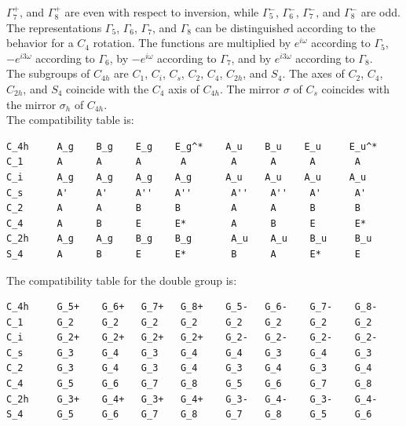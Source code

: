 \documentclass[12pt,a4paper]{article}
\begin{document}
$\Gamma_7^+$, and $\Gamma_8^+$ are even with respect to inversion, while
$\Gamma_5^-$, $\Gamma_6^-$, $\Gamma_7^-$, and $\Gamma_8^-$ are odd.
The representations $\Gamma_5$, $\Gamma_6$, $\Gamma_7$, and $\Gamma_8$ can
be distinguished according to the behavior for a $C_4$ rotation. The
functions are multiplied by $e^{i\omega}$ according to $\Gamma_5$,
$-e^{i3\omega}$ according to $\Gamma_6$, by $-e^{i\omega}$ according to
$\Gamma_7$, and by $e^{i3\omega}$ according to $\Gamma_8$.\\
The subgroups of $C_{4h}$ are $C_1$, $C_i$, $C_s$, $C_2$, $C_4$, $C_{2h}$,
and $S_4$.  The axes of $C_2$, $C_4$, $C_{2h}$, and $S_4$
coincide with the $C_4$ axis of $C_{4h}$.
The mirror $\sigma$ of $C_s$ coincides with the mirror $\sigma_h$ of $C_{4h}$. \\
The compatibility table is:
\begin{verbatim}
C_4h     A_g    B_g    E_g    E_g^*    A_u    B_u    E_u     E_u^*
C_1      A      A      A       A        A      A      A       A
C_i      A_g    A_g    A_g    A_g      A_u    A_u    A_u     A_u
C_s      A'     A'     A''    A''       A''    A''    A'      A'
C_2      A      A      B      B         A      A      B       B
C_4      A      B      E      E*        A      B      E       E*
C_2h     A_g    A_g    B_g    B_g       A_u    A_u    B_u     B_u
S_4      A      B      E      E*        B      A      E*      E 
\end{verbatim}
The compatibility table for the double group is:
\begin{verbatim}
C_4h     G_5+    G_6+   G_7+   G_8+    G_5-   G_6-    G_7-    G_8-
C_1      G_2     G_2    G_2    G_2     G_2    G_2     G_2     G_2
C_i      G_2+    G_2+   G_2+   G_2+    G_2-   G_2-    G_2-    G_2-     
C_s      G_3     G_4    G_3    G_4     G_4    G_3     G_4     G_3
C_2      G_3     G_4    G_3    G_4     G_3    G_4     G_3     G_4
C_4      G_5     G_6    G_7    G_8     G_5    G_6     G_7     G_8
C_2h     G_3+    G_4+   G_3+   G_4+    G_3-   G_4-    G_3-    G_4-
S_4      G_5     G_6    G_7    G_8     G_7    G_8     G_5     G_6
\end{verbatim}
\end{document}
